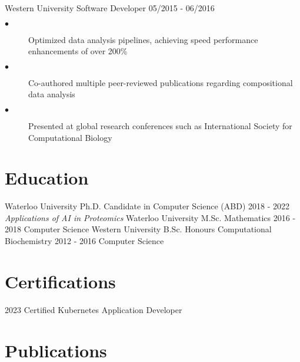 \documentclass[]{twentysecondcv}
\begin{document}
\begin{twenty}
\twentyitem
    {Western University}
    {Software Developer}
    {05/2015 - 06/2016}
    {
    \vspace{-15pt}
    \begin{description}
        \item[$\bullet$] Optimized data analysis pipelines, achieving speed performance enhancements of over 200\%
        \item[$\bullet$] Co-authored multiple peer-reviewed publications regarding compositional data analysis
        \item[$\bullet$]Presented at global research conferences such as International Society for Computational Biology
    \end{description}
}

\end{twenty}





\section{Education}

\begin{twenty}
  \twentyitem
    {Waterloo University}
    {Ph.D. {\normalfont Candidate in Computer Science} (ABD)}
    {2018 - 2022}
    {\emph{Applications of AI in Proteomics}}
  \twentyitem
    {Waterloo University}
    {M.Sc. Mathematics}
    {2016 - 2018}
    {Computer Science}
  \twentyitem
    {Western University}
    {B.Sc. Honours Computational Biochemistry}
    {2012 - 2016}
    {Computer Science}
\end{twenty}


\section{Certifications}

\begin{twentyshort}
  \twentyitemshort
    {2023}
    {Certified Kubernetes Application Developer}
\end{twentyshort}


\section{Publications}
\end{document}
